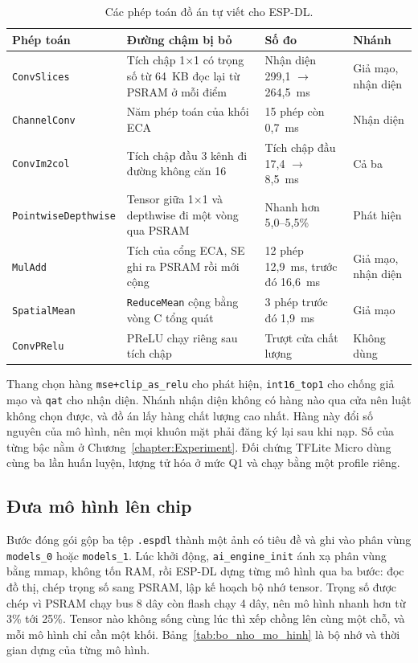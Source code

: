 \documentclass[../DoAn.tex]{subfiles}
\begin{document}
\begin{table}[!htb]
\centering
\small
\caption{Các phép toán đồ án tự viết cho ESP-DL.}
\label{tab:phep_toan}
\begin{tabular}{|L{4.6cm}|L{3.8cm}|L{2.9cm}|L{1.9cm}|}
\hline
\textbf{Phép toán} & \textbf{Đường chậm bị bỏ} & \textbf{Số đo} & \textbf{Nhánh} \\
\hline
\texttt{ConvSlices} & Tích chập 1$\times$1 có trọng số từ 64~KB đọc lại từ PSRAM ở mỗi điểm & Nhận diện 299,1 $\to$ 264,5~ms & Giả mạo, nhận diện \\
\hline
\texttt{ChannelConv} & Năm phép toán của khối ECA & 15 phép còn 0,7~ms & Nhận diện \\
\hline
\texttt{ConvIm2col} & Tích chập đầu 3 kênh đi đường không căn 16 & Tích chập đầu 17,4 $\to$ 8,5~ms & Cả ba \\
\hline
\mbox{\texttt{PointwiseDepthwise}} & Tensor giữa 1$\times$1 và depthwise đi một vòng qua PSRAM & Nhanh hơn 5,0--5,5\% & Phát hiện \\
\hline
\texttt{MulAdd} & Tích của cổng ECA, SE ghi ra PSRAM rồi mới cộng & 12 phép 12,9~ms, trước đó 16,6~ms & Giả mạo, nhận diện \\
\hline
\texttt{SpatialMean} & \texttt{ReduceMean} cộng bằng vòng C tổng quát & 3 phép trước đó 1,9~ms & Giả mạo \\
\hline
\texttt{ConvPRelu} & PReLU chạy riêng sau tích chập & Trượt cửa chất lượng & Không dùng \\
\hline
\end{tabular}
\end{table}

Thang chọn hàng \texttt{mse+clip\_as\_relu} cho phát hiện, \texttt{int16\_top1} cho chống giả mạo và
\texttt{qat} cho nhận diện. Nhánh nhận diện không có hàng nào qua cửa nên luật không chọn được, và đồ
án lấy hàng chất lượng cao nhất. Hàng này đổi số nguyên của mô hình, nên mọi khuôn mặt phải đăng ký
lại sau khi nạp. Số của từng bậc nằm ở Chương~\ref{chapter:Experiment}. Đối chứng TFLite Micro dùng
cùng ba lần huấn luyện, lượng tử hóa ở mức Q1 và chạy bằng một profile riêng.

\subsection{Đưa mô hình lên chip}
\label{section:4.3.5}

Bước đóng gói gộp ba tệp \texttt{.espdl} thành một ảnh có tiêu đề và ghi vào phân vùng
\texttt{models\_0} hoặc \texttt{models\_1}. Lúc khởi động, \texttt{ai\_engine\_init} ánh xạ phân
vùng bằng mmap, không tốn RAM, rồi ESP-DL dựng từng mô hình qua ba bước: đọc đồ thị, chép trọng số
sang PSRAM, lập kế hoạch bộ nhớ tensor. Trọng số được chép vì PSRAM chạy bus 8 dây còn flash chạy 4 dây, nên mô hình nhanh hơn từ 3\% tới 25\%. Tensor nào không sống cùng
lúc thì xếp chồng lên cùng một chỗ, và mỗi mô hình chỉ cần một khối. Bảng~\ref{tab:bo_nho_mo_hinh} là bộ nhớ và thời gian dựng của từng mô hình.
\end{document}
